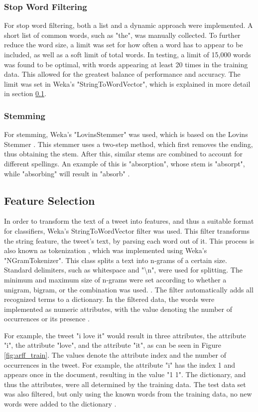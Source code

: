\subsubsection{Stop Word Filtering}
For stop word filtering, both a list and a dynamic approach were implemented. A short list of common words, such as "the", was manually collected. To further reduce the word size, a limit was set for how often a word has to appear to be included, as well as a soft limit of total words. In testing, a limit of 15,000 words was found to be optimal, with words appearing at least 20 times in the training data. This allowed for the greatest balance of performance and accuracy. The limit was set in Weka's "StringToWordVector", which is explained in more detail in section \ref{sub:feature_selec}.

\subsubsection{Stemming}
For stemming, Weka's "LovinsStemmer" was used, which is based on the Lovins Stemmer \cite{Weka}. This stemmer uses a two-step method, which first removes the ending, thus obtaining the stem. After this, similar stems are combined to account for different spellings. An example of this is "absorption", whose stem is "absorpt", while "absorbing" will result in "absorb" \cite{Lovins1968DevelopmentOA}.

\subsection{Feature Selection}
\label{sub:feature_selec}
In order to transform the text of a tweet into features, and thus a suitable format for classifiers, Weka's StringToWordVector filter was used. This filter transforms the string feature, the tweet's text, by parsing each word out of it. This process is also known as tokenization \cite{DBLP:journals/csur/GiachanouC16}, which was implemented using Weka's "NGramTokenizer". This class splits a text into n-grams of a certain size. Standard delimiters, such as whitespace and "\textbackslash n", were used for splitting. The minimum and maximum size of n-grams were set according to whether a unigram, bigram, or the combination was used. \cite{Weka}. The filter automatically adds all recognized terms to a dictionary. In the filtered data, the words were implemented as numeric attributes, with the value denoting the number of occurrences or its presence \cite{Weka}.

For example, the tweet "i love it" would result in three attributes, the attribute "i", the attribute "love", and the attribute "it", as can be seen in Figure \ref{fig:arff_train}. The values denote the attribute index and the number of occurrences in the tweet. For example, the attribute "i" has the index 1 and appears once in the document, resulting in the value "1 1". The dictionary, and thus the attributes, were all determined by the training data. The test data set was also filtered, but only using the known words from the training data, no new words were added to the dictionary \cite{Weka}.


